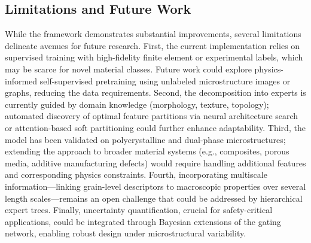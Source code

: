 \documentclass{article}
\begin{document}
\subsection{Limitations and Future Work}
While the framework demonstrates substantial improvements, several limitations delineate avenues for future research. First, the current implementation relies on supervised training with high-fidelity finite element or experimental labels, which may be scarce for novel material classes. Future work could explore physics-informed self-supervised pretraining using unlabeled microstructure images or graphs, reducing the data requirements. Second, the decomposition into experts is currently guided by domain knowledge (morphology, texture, topology); automated discovery of optimal feature partitions via neural architecture search or attention-based soft partitioning could further enhance adaptability. Third, the model has been validated on polycrystalline and dual-phase microstructures; extending the approach to broader material systems (e.g., composites, porous media, additive manufacturing defects) would require handling additional features and corresponding physics constraints. Fourth, incorporating multiscale information—linking grain-level descriptors to macroscopic properties over several length scales—remains an open challenge that could be addressed by hierarchical expert trees. Finally, uncertainty quantification, crucial for safety-critical applications, could be integrated through Bayesian extensions of the gating network, enabling robust design under microstructural variability.



\end{document}
